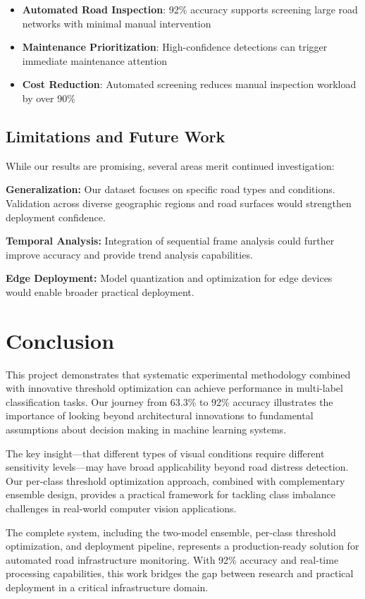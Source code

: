 \documentclass[12pt]{article}
\begin{document}
\begin{itemize}[itemsep=1pt,parsep=0pt,topsep=3pt]
\item \textbf{Automated Road Inspection}: 92\% accuracy supports screening large road networks with minimal manual intervention
\item \textbf{Maintenance Prioritization}: High-confidence detections can trigger immediate maintenance attention
\item \textbf{Cost Reduction}: Automated screening reduces manual inspection workload by over 90\%
\end{itemize}

\subsection{Limitations and Future Work}

While our results are promising, several areas merit continued investigation:

\textbf{Generalization:} Our dataset focuses on specific road types and conditions. Validation across diverse geographic regions and road surfaces would strengthen deployment confidence.

\textbf{Temporal Analysis:} Integration of sequential frame analysis could further improve accuracy and provide trend analysis capabilities.

\textbf{Edge Deployment:} Model quantization and optimization for edge devices would enable broader practical deployment.

\section{Conclusion}

This project demonstrates that systematic experimental methodology combined with innovative threshold optimization can achieve performance in multi-label classification tasks. Our journey from 63.3\% to 92\% accuracy illustrates the importance of looking beyond architectural innovations to fundamental assumptions about decision making in machine learning systems.

The key insight—that different types of visual conditions require different sensitivity levels—may have broad applicability beyond road distress detection. Our per-class threshold optimization approach, combined with complementary ensemble design, provides a practical framework for tackling class imbalance challenges in real-world computer vision applications.

The complete system, including the two-model ensemble, per-class threshold optimization, and deployment pipeline, represents a production-ready solution for automated road infrastructure monitoring. With 92\% accuracy and real-time processing capabilities, this work bridges the gap between research and practical deployment in a critical infrastructure domain.
\end{document}
